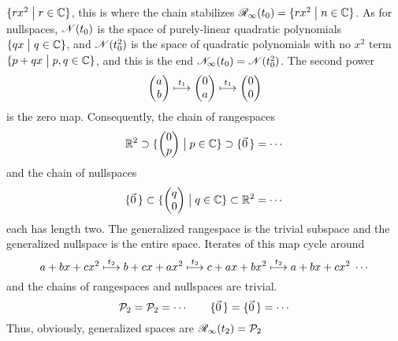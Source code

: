 \begin{exercises}
\begin{answer}
\begin{exparts}
           $\mbox{$\{rx^2\bigm| r\in \mathbb{C}\}$}$, 
           this is where the chain stabilizes
           $\mathscr{R}_\infty(t_0)=\mbox{$\{rx^2\bigm| n\in \mathbb{C}\}$}$. 
           As for nullspaces, 
           $\mathscr{N}(t_0)$ is the space of purely-linear quadratic 
           polynomials $\mbox{$\{qx\bigm| q\in \mathbb{C}\}$}$, and
           $\mathscr{N}(t_0^2)$ is the space of quadratic polynomials
           with no $x^2$ term $\mbox{$\{p+qx\bigm| p,q\in \mathbb{C}\}$}$, and
           this is the end $\mathscr{N}_\infty(t_0)=\mathscr{N}(t_0^2)$. 
         \partsitem The second power
           \begin{equation*}
             \begin{pmatrix} a \\ b \end{pmatrix}
              \stackrel{t_1}{\longmapsto}\begin{pmatrix} 0 \\ a \end{pmatrix}
              \stackrel{t_1}{\longmapsto}\begin{pmatrix} 0 \\ 0 \end{pmatrix}
           \end{equation*}
           is the zero map.
           Consequently, the chain of rangespaces
           \begin{equation*}
             \mathbb{R}^2
               \supset\mbox{$\{\begin{pmatrix} 0 \\ p \end{pmatrix}\bigm| p\in\mathbb{C}\}$}
               \supset\mbox{$\{\vec{0}\,\}$}
               =\cdots
           \end{equation*}
           and the chain of nullspaces 
           \begin{equation*}
             \mbox{$\{\vec{0}\,\}$}
               \subset\mbox{$\{\begin{pmatrix} q \\ 0 \end{pmatrix}\bigm| q\in\mathbb{C}\}$}
               \subset\mathbb{R}^2
               =\cdots
           \end{equation*}
           each has length two.
           The generalized rangespace is the trivial subspace and the
           generalized nullspace is the entire space.
         \partsitem Iterates of this map cycle around
           \begin{equation*}
             a+bx+cx^2
               \stackrel{t_2}{\longmapsto} b+cx+ax^2            
               \stackrel{t_2}{\longmapsto} c+ax+bx^2            
               \stackrel{t_2}{\longmapsto} a+bx+cx^2
               \;\cdots            
           \end{equation*}
           and the chains of rangespaces and nullspaces are trivial. 
           \begin{equation*}
             \mathcal{P}_2=\mathcal{P}_2=\cdots
              \qquad
              \mbox{$\{\vec{0}\,\}$}=\mbox{$\{\vec{0}\,\}$}=\cdots  
           \end{equation*}
           Thus, obviously,
           generalized spaces are $\mathscr{R}_\infty(t_2)=\mathcal{P}_2$

\end{exparts}
\end{answer}
\end{exercises}
